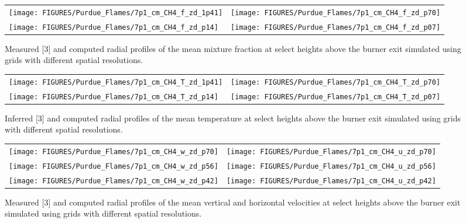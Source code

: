 \begin{figure}[p]
\begin{tabular*}{\textwidth}{l@{\extracolsep{\fill}}r}
\texttt{[image: FIGURES/Purdue\_Flames/7p1\_cm\_CH4\_f\_zd\_1p41]} &
\texttt{[image: FIGURES/Purdue\_Flames/7p1\_cm\_CH4\_f\_zd\_p70]} \\
\texttt{[image: FIGURES/Purdue\_Flames/7p1\_cm\_CH4\_f\_zd\_p14]} &
\texttt{[image: FIGURES/Purdue\_Flames/7p1\_cm\_CH4\_f\_zd\_p07]}
\end{tabular*}
\caption[Purdue 7.1 cm methane flame mean mixture fraction profiles]
{Measured [3] and computed radial profiles of the mean mixture fraction at select heights above the burner exit simulated using grids with different spatial resolutions.}
\label{Purdue_7p1_CH4_mixture_fraction}
\end{figure}

\begin{figure}[p]
\begin{tabular*}{\textwidth}{l@{\extracolsep{\fill}}r}
\texttt{[image: FIGURES/Purdue\_Flames/7p1\_cm\_CH4\_T\_zd\_1p41]} &
\texttt{[image: FIGURES/Purdue\_Flames/7p1\_cm\_CH4\_T\_zd\_p70]} \\
\texttt{[image: FIGURES/Purdue\_Flames/7p1\_cm\_CH4\_T\_zd\_p14]} &
\texttt{[image: FIGURES/Purdue\_Flames/7p1\_cm\_CH4\_T\_zd\_p07]}
\end{tabular*}
\caption[Purdue 7.1 cm methane flame mean temperature profiles]
{Inferred [3] and computed radial profiles of the mean temperature at select heights above the burner exit simulated using grids with different spatial resolutions.}
\label{Purdue_7p1_CH4_temperature}
\end{figure}


\begin{figure}[p]
\begin{tabular*}{\textwidth}{l@{\extracolsep{\fill}}r}
\texttt{[image: FIGURES/Purdue\_Flames/7p1\_cm\_CH4\_w\_zd\_p70]} &
\texttt{[image: FIGURES/Purdue\_Flames/7p1\_cm\_CH4\_u\_zd\_p70]} \\
\texttt{[image: FIGURES/Purdue\_Flames/7p1\_cm\_CH4\_w\_zd\_p56]} &
\texttt{[image: FIGURES/Purdue\_Flames/7p1\_cm\_CH4\_u\_zd\_p56]} \\
\texttt{[image: FIGURES/Purdue\_Flames/7p1\_cm\_CH4\_w\_zd\_p42]} &
\texttt{[image: FIGURES/Purdue\_Flames/7p1\_cm\_CH4\_u\_zd\_p42]}
\end{tabular*}
\caption[Purdue 7.1 cm methane flame mean velocity profiles]
{Measured [3] and computed radial profiles of the mean vertical and horizontal velocities at select heights above the burner exit simulated using grids with different spatial resolutions.}
\label{Purdue_7p1_CH4_vertical_velocity}
\end{figure}



